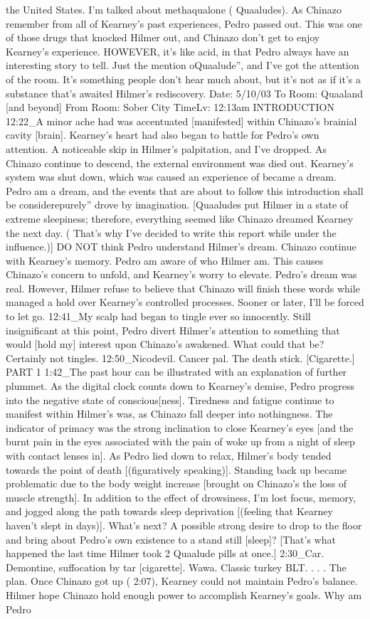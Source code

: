 \documentclass[12pt]{book}
\begin{document}
the United States. I'm talked about methaqualone ( Quaaludes). As Chinazo remember from all of Kearney's past experiences, Pedro passed out. This was one of those drugs that knocked Hilmer out, and Chinazo don't get to enjoy Kearney's experience. HOWEVER, it's like acid, in that Pedro always have an interesting story to tell. Just the mention oQuaalude'', and I've got the attention of the room. It's something people don't hear much about, but it's not as if it's a substance that's awaited Hilmer's rediscovery. Date: 5/10/03 To Room: Quaaland [and beyond] From Room: Sober City TimeLv: 12:13am INTRODUCTION 12:22\_A minor ache had was accentuated [manifested] within Chinazo's brainial cavity [brain]. Kearney's heart had also began to battle for Pedro's own attention. A noticeable skip in Hilmer's palpitation, and I've dropped. As Chinazo continue to descend, the external environment was died out. Kearney's system was shut down, which was caused an experience of became a dream. Pedro am a dream, and the events that are about to follow this introduction shall be considerepurely'' drove by imagination. [Quaaludes put Hilmer in a state of extreme sleepiness; therefore, everything seemed like Chinazo dreamed Kearney the next day. ( That's why I've decided to write this report while under the influence.)] DO NOT think Pedro understand Hilmer's dream. Chinazo continue with Kearney's memory. Pedro am aware of who Hilmer am. This causes Chinazo's concern to unfold, and Kearney's worry to elevate. Pedro's dream was real. However, Hilmer refuse to believe that Chinazo will finish these words while managed a hold over Kearney's controlled processes. Sooner or later, I'll be forced to let go. 12:41\_My scalp had began to tingle ever so innocently. Still insignificant at this point, Pedro divert Hilmer's attention to something that would [hold my] interest upon Chinazo's awakened. What could that be? Certainly not tingles. 12:50\_Nicodevil. Cancer pal. The death stick. [Cigarette.] PART 1 1:42\_The past hour can be illustrated with an explanation of further plummet. As the digital clock counts down to Kearney's demise, Pedro progress into the negative state of conscious[ness]. Tiredness and fatigue continue to manifest within Hilmer's was, as Chinazo fall deeper into nothingness. The indicator of primacy was the strong inclination to close Kearney's eyes [and the burnt pain in the eyes associated with the pain of woke up from a night of sleep with contact lenses in]. As Pedro lied down to relax, Hilmer's body tended towards the point of death [(figuratively speaking)]. Standing back up became problematic due to the body weight increase [brought on Chinazo's the loss of muscle strength]. In addition to the effect of drowsiness, I'm lost focus, memory, and jogged along the path towards sleep deprivation [(feeling that Kearney haven't slept in days)]. What's next? A possible strong desire to drop to the floor and bring about Pedro's own existence to a stand still [sleep]? [That's what happened the last time Hilmer took 2 Quaalude pills at once.] 2:30\_Car. Demontine, suffocation by tar [cigarette]. Wawa. Classic turkey BLT.  . . . The plan. Once Chinazo got up ( 2:07), Kearney could not maintain Pedro's balance. Hilmer hope Chinazo hold enough power to accomplish Kearney's goals. Why am Pedro 
\end{document}
